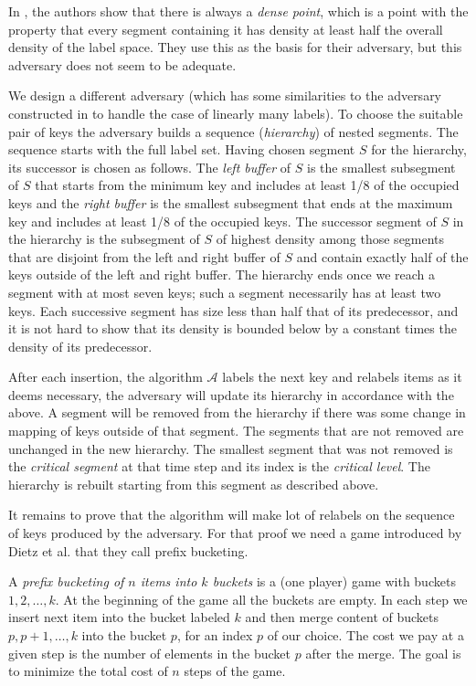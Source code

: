 \documentclass[runningheads,a4paper]{llncs}
\newcommand{\A}{\mathcal{A}}
\begin{document}
In \cite{DSZ04}, the authors show that there is always a \emph{dense point}, which is
a point  with the property that every segment containing it
has density at least half the overall density of the label space.  They use this as the basis for their
adversary, but this adversary does not seem to be adequate.

We design a different adversary (which has some similarities to the adversary constructed in \cite{BKS} to handle
the case of linearly many labels).
To choose the suitable pair of keys the adversary builds a sequence (\emph{hierarchy}) of nested segments. The sequence
starts with the full label set.  Having chosen segment $S$ for the hierarchy, its successor is chosen as follows.
The {\em left buffer} of $S$
is the smallest subsegment of $S$ that starts from the minimum key and
includes at least 1/8 of the occupied keys and the {\em right buffer} is the smallest subsegment that ends at the maximum key
and includes at least 1/8 of the occupied keys.  The successor segment of $S$ in the hierarchy is
the subsegment of $S$
of highest density among those segments that are disjoint from the left and right buffer of $S$ and contain exactly
half of the keys outside of the left and right buffer.
The hierarchy ends once we reach a segment with at most seven keys; such a segment necessarily has at least two keys.
Each successive segment has size less than half that of its predecessor, and it is not hard to show that 
its density is bounded below by a constant times the density of its predecessor.   

After each insertion,
the algorithm $\A$ labels the next key and relabels items as it deems necessary, the adversary will update its
hierarchy in accordance with the above.  A segment will be removed from the hierarchy if there was some change in mapping of keys outside of that segment.
The segments that are not removed are unchanged in the new hierarchy.
The smallest segment that was not removed is the \emph{critical segment} at that time step and its index is the \emph{critical level}.
The hierarchy is  rebuilt starting from this segment as described above.

It remains to prove that the algorithm will make lot of relabels on the sequence
of keys produced by the adversary. 
For that proof we need a game introduced by Dietz et al. \cite{DSZ04} that they
call prefix bucketing.

A \emph{prefix bucketing of $n$ items into $k$ buckets} is a (one player) game with buckets $1,2,\dots,k$. At the beginning of the game
all the buckets are empty. In each step we insert next item into the bucket labeled $k$ and then merge
content of buckets $p,p+1,\dots,k$ into the bucket $p$, for an index $p$ of our choice. The cost we pay at a given step
is the number of elements in the bucket $p$ after the merge. The goal is to minimize the total cost of $n$ steps 
of the game. 
\end{document}
